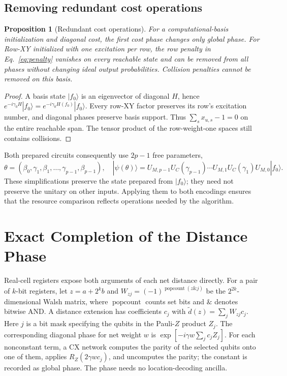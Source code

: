 \documentclass[manuscript,screen,review]{acmart}
\newtheorem{proposition}{Proposition}
\begin{document}
\subsection{Removing redundant cost operations}
\begin{proposition}[Redundant cost operations]
For a computational-basis initialization and diagonal cost, the first cost
phase changes only global phase. For Row-XY initialized with one excitation
per row, the row penalty in Eq.~\eqref{eq:penalty} vanishes on every reachable
state and can be removed from all phases without changing ideal output
probabilities. Collision penalties cannot be removed on this basis.
\end{proposition}
\begin{proof}
A basis state $|f_0\rangle$ is an eigenvector of diagonal $H$, hence
$e^{-i\gamma_0H}|f_0\rangle=e^{-i\gamma_0H(f_0)}|f_0\rangle$.
Every row-XY factor preserves its row's excitation number, and diagonal phases
preserve basis support. Thus $\sum_s x_{u,s}-1=0$ on the entire reachable span.
The tensor product of the row-weight-one spaces still contains collisions.
\end{proof}

Both prepared circuits consequently use $2p-1$ free parameters,
\begin{equation}
 \theta=(\beta_0,\gamma_1,\beta_1,\ldots,\gamma_{p-1},\beta_{p-1}),\quad
 |\psi(\theta)\rangle=
 U_{M,p-1}U_C(\gamma_{p-1})\cdots U_{M,1}U_C(\gamma_1)
 U_{M,0}|f_0\rangle.
 \label{eq:ansatz}
\end{equation}
These simplifications preserve the state prepared from $|f_0\rangle$;
they need not preserve the unitary on other inputs. Applying them to both
encodings ensures that the resource comparison reflects operations needed
by the algorithm.

\section{Exact Completion of the Distance Phase}
\label{sec:completion}
Real-cell registers expose both arguments of each net distance directly.
For a pair of $k$-bit registers, let $z=a+2^kb$ and
$W_{zj}=(-1)^{\operatorname{popcount}(z\mathbin{\&}j)}$ be the
$2^{2k}$-dimensional Walsh matrix, where $\operatorname{popcount}$ counts
set bits and $\&$ denotes bitwise AND. A distance extension has coefficients
$c_j$ with $\widetilde d(z)=\sum_jW_{zj}c_j$.
Here $j$ is a bit mask specifying the qubits in the Pauli-$Z$ product $Z_j$.
The corresponding diagonal phase for net weight $w$ is
$\exp[-i\gamma w\sum_j c_j Z_j]$. For each nonconstant term, a CX network computes the parity of the
selected qubits onto one of them, applies $R_Z(2\gamma wc_j)$, and
uncomputes the parity; the constant is
recorded as global phase. The phase needs no location-decoding ancilla.
\end{document}
